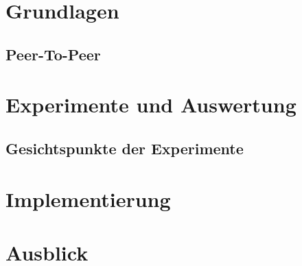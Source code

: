 \documentclass{book}
\begin{document}

%


\frontmatter

\tableofcontents
\listoffigures

\mainmatter


\chapter{Grundlagen}
\section{Peer-To-Peer}




\chapter{Experimente und Auswertung}
\section{Gesichtspunkte der Experimente}
\chapter{Implementierung}
\chapter{Ausblick}



\end{document}

